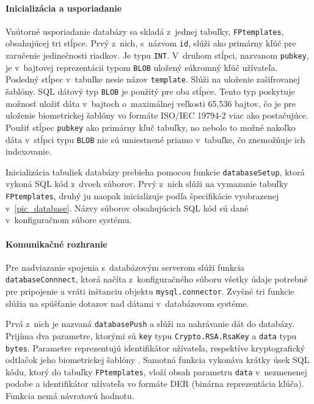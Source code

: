 \paragraph{Inicializácia a usporiadanie}
Vnútorné usporiadanie databázy sa skladá z~jednej tabuľky, \texttt{FPtemplates}, obsahujúcej tri stĺpce. Prvý z~nich, s~názvom \texttt{id}, slúži ako primárny kľúč pre zaručenie jedinečnosti riadkov. Je typu \texttt{INT}. V~druhom stĺpci, nazvanom \texttt{pubkey}, je v~bajtovej reprezentácii typom \texttt{BLOB} uložený súkromný kľúč užívateľa. Posledný stĺpec v~tabuľke nesie názov \texttt{template}. Slúži na uloženie zašifrovanej šablóny. SQL dátový typ \texttt{BLOB} je použitý pre oba stĺpce. Tento typ poskytuje možnosť uložiť dáta v~bajtoch o~maximálnej veľkosti 65,536 bajtov, čo je pre uloženie biometrickej šablóny vo formáte ISO/IEC 19794-2 viac ako postačujúce. Použiť stĺpec \texttt{pubkey} ako primárny kľuč tabuľky, no nebolo to možné nakoľko dáta v~stĺpci typu \texttt{BLOB} nie sú umiestnené priamo v~tabuľke, čo znemožňuje ich indexovanie.

Inicializácia tabuliek databázy prebieha pomocou funkcie \texttt{databaseSetup}, ktorá vykoná SQL kód z~dvoch súborov. Prvý z~nich slúži na vymazanie tabuľky \texttt{FPtemplates}, druhý ju naopak inicializuje podľa špecifikácie vyobrazenej v~\ref{pic_database}. Názvy súborov obsahujúcich SQL kód sú dané v~konfiguračnom súbore systému.

\paragraph{Komunikačné rozhranie}
Pre nadviazanie spojenia s~databázovým serverom slúži funkcia \texttt{databaseConnnect}, ktorá načíta z~konfiguračného súboru všetky údaje potrebné pre pripojenie a vráti inštanciu objektu \texttt{mysql.connector}. Zvyšné tri funkcie slúžia na spúšťanie dotazov nad dátami v~databázovom systéme. 

Prvá z~nich je nazvaná \texttt{databasePush} a slúži na nahrávanie dát do databázy. Prijíma dva parametre, ktorými sú \texttt{key} typu \texttt{Crypto.RSA.RsaKey} a \texttt{data} typu \texttt{bytes}. Parametre reprezentujú identifikátor užívateľa, respektíve kryptografický odtlačok jeho biometrickej šablóny . Samotná funkcia vykonáva krátky úsek SQL kódu, ktorý do tabuľky \texttt{FPtemplates}, vloží obsah parametru \texttt{data} v~nezmenenej podobe a identifikátor užívateľa vo formáte DER (binárna reprezentácia kľúča). Funkcia nemá návratovú hodnotu.

